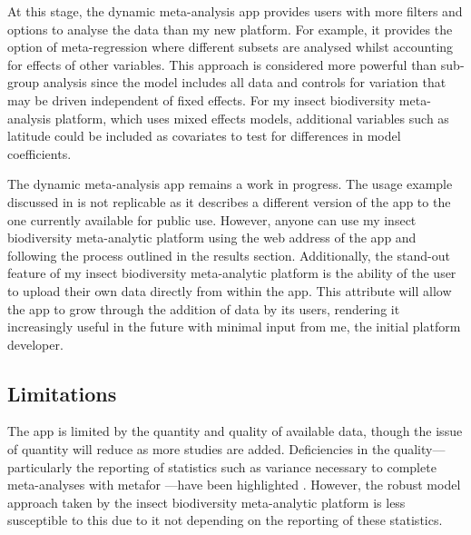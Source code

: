 \documentclass[11pt]{article}
\begin{document}
		\noindent At this stage, the dynamic meta-analysis app \citep{shackelford2021dynamic} provides users with more filters and options to analyse the data than my new platform. For example, it provides the option of meta-regression where different subsets are analysed whilst accounting for effects of other variables. This approach is considered more powerful than sub-group analysis since the model includes all data and controls for variation that may be driven independent of fixed effects. For my insect biodiversity meta-analysis platform, which uses mixed effects models, additional variables such as latitude could be included as covariates to test for differences in model coefficients. 
		
		\noindent The dynamic meta-analysis app remains a work in progress. The usage example discussed in \citet{shackelford2021dynamic} is not replicable as it describes a different version of the app to the one currently available for public use. However, anyone can use my insect biodiversity meta-analytic platform using the web address of the app and following the process outlined in the results section. Additionally, the stand-out feature of my insect biodiversity meta-analytic platform is the ability of the user to upload their own data directly from within the app. This attribute will allow the app to grow through the addition of data by its users, rendering it increasingly useful in the future with minimal input from me, the initial platform developer. 
		
		\subsection{Limitations}
		The app is limited by the quantity and quality of available data, though the issue of quantity will reduce as more studies are added. Deficiencies in the quality—particularly the reporting of statistics such as variance necessary to complete meta-analyses with metafor \citep{viechtbauer2010conducting}—have been highlighted \citep{hedges1999meta,stewart2010meta,gurevitch2018meta}. However, the robust model approach taken by the insect biodiversity meta-analytic platform is less susceptible to this due to it not depending on the reporting of these statistics. 
		
\end{document}

